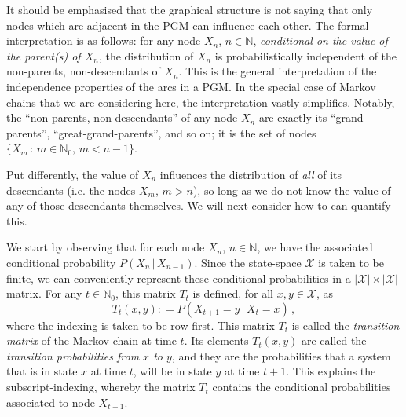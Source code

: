 \documentclass[graybox]{svmult}
\newcommand{\nats}{\mathbb{N}}
\newcommand{\natswith}{\nats_{0}}
\newcommand{\states}{\mathcal{X}}
\newcommand{\coloneqq}{:\!=}
\begin{document}
It should be emphasised that the graphical structure is not saying that only nodes which are adjacent in the PGM can influence each other. The formal interpretation is as follows: for any node $X_n$, $n\in\nats$, \emph{conditional on the value of the parent(s) of $X_n$}, the distribution of $X_n$ is probabilistically independent of the non-parents, non-descendants of $X_n$. This is the general interpretation of the independence properties of the arcs in a PGM. In the special case of Markov chains that we are considering here, the interpretation vastly simplifies. Notably, the ``non-parents, non-descendants'' of any node $X_n$ are exactly its ``grand-parents'', ``great-grand-parents'', and so on; it is the set of nodes $\{X_{m}\,:\,m\in\natswith,\, m<n-1\}$.

Put differently, the value of $X_n$ influences the distribution of \emph{all} of its descendants (i.e. the nodes $X_m$, $m>n$), so long as we do not know the value of any of those descendants themselves. We will next consider how to can quantify this.

We start by observing that for each node $X_n$, $n\in\nats$, we have the associated conditional probability $P(X_n\,\vert\,X_{n-1})$. Since the state-space $\states$ is taken to be finite, we can conveniently represent these conditional probabilities in a $\lvert\states\rvert\times\lvert\states\rvert$ matrix. For any $t\in\natswith$, this matrix $T_t$ is defined, for all $x,y\in\states$, as
\begin{equation*}
T_t(x,y) \coloneqq P(X_{t+1}=y\,\vert\,X_t=x)\,,
\end{equation*}
where the indexing is taken to be row-first. This matrix $T_t$ is called the \emph{transition matrix} of the Markov chain at time $t$. Its elements $T_t(x,y)$ are called the \emph{transition probabilities from $x$ to $y$}, and they are the probabilities that a system that is in state $x$ at time $t$, will be in state $y$ at time $t+1$. This explains the subscript-indexing, whereby the matrix $T_t$ contains the conditional probabilities associated to node $X_{t+1}$.
\end{document}
